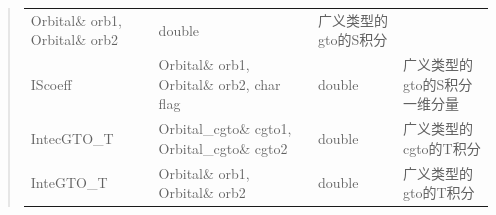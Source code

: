 \documentclass[11pt]{article}
\begin{document}
\begin{quote}
\begin{longtable}[]{@{}llll@{}}
\begin{minipage}[t]{0.37\columnwidth}
Orbital\& orb1, Orbital\& orb2\strut
\end{minipage} & \begin{minipage}[t]{0.07\columnwidth}\raggedright\strut
double\strut
\end{minipage} & \begin{minipage}[t]{0.27\columnwidth}\raggedright\strut
广义类型的gto的S积分\strut
\end{minipage}\tabularnewline
\begin{minipage}[t]{0.17\columnwidth}\raggedright\strut
IScoeff\strut
\end{minipage} & \begin{minipage}[t]{0.37\columnwidth}\raggedright\strut
Orbital\& orb1, Orbital\& orb2, char flag\strut
\end{minipage} & \begin{minipage}[t]{0.07\columnwidth}\raggedright\strut
double\strut
\end{minipage} & \begin{minipage}[t]{0.27\columnwidth}\raggedright\strut
广义类型的gto的S积分一维分量\strut
\end{minipage}\tabularnewline
\begin{minipage}[t]{0.17\columnwidth}\raggedright\strut
IntecGTO\_T\strut
\end{minipage} & \begin{minipage}[t]{0.37\columnwidth}\raggedright\strut
Orbital\_cgto\& cgto1, Orbital\_cgto\& cgto2\strut
\end{minipage} & \begin{minipage}[t]{0.07\columnwidth}\raggedright\strut
double\strut
\end{minipage} & \begin{minipage}[t]{0.27\columnwidth}\raggedright\strut
广义类型的cgto的T积分\strut
\end{minipage}\tabularnewline
\begin{minipage}[t]{0.17\columnwidth}\raggedright\strut
InteGTO\_T\strut
\end{minipage} & \begin{minipage}[t]{0.37\columnwidth}\raggedright\strut
Orbital\& orb1, Orbital\& orb2\strut
\end{minipage} & \begin{minipage}[t]{0.07\columnwidth}\raggedright\strut
double\strut
\end{minipage} & \begin{minipage}[t]{0.27\columnwidth}\raggedright\strut
广义类型的gto的T积分\strut
\end{minipage}\tabularnewline

\end{longtable}
\end{quote}
\end{document}
